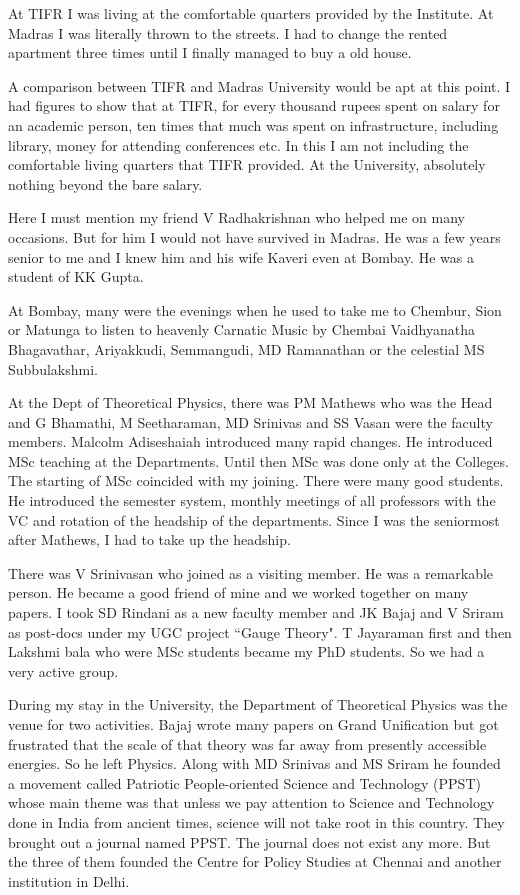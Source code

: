 At TIFR I was living at the comfortable quarters provided by the 
Institute. At Madras I was literally thrown to the streets. I had to 
change the rented apartment three times until I finally managed to buy a 
old house.

A comparison between TIFR and Madras University would be apt at this 
point. I had figures to show that at TIFR, for every thousand rupees 
spent on salary for an academic person, ten times that much was spent on 
infrastructure, including library, money for attending conferences etc. 
In this I am not including the comfortable living quarters that TIFR 
provided. At the University, absolutely nothing beyond the bare salary.

Here I must mention my friend V Radhakrishnan who helped me on many 
occasions. But for him I would not have survived in Madras. He was a few 
years senior to me and I knew him and his wife Kaveri even at Bombay. He 
was a student of KK Gupta.

At Bombay, many were the evenings when he used to take me to Chembur, 
Sion or Matunga to listen to heavenly Carnatic Music by Chembai 
Vaidhyanatha Bhagavathar, Ariyakkudi, Semmangudi, MD Ramanathan or the 
celestial MS Subbulakshmi.

At the Dept of Theoretical Physics, there was PM Mathews who was the 
Head and G Bhamathi, M Seetharaman, MD Srinivas and SS Vasan were the 
faculty members. Malcolm Adiseshaiah introduced many rapid changes. He 
introduced MSc teaching at the Departments. Until then MSc was done only 
at the Colleges. The starting of MSc coincided with my joining. There 
were many good students. He introduced the semester system, monthly 
meetings of all professors with the VC and rotation of the headship of 
the departments. Since I was the seniormost after Mathews, I had to take 
up the headship.

There was V Srinivasan who joined as a visiting member. He was a 
remarkable person. He became a good friend of mine and we worked 
together on many papers. I took SD Rindani as a new faculty member and 
JK Bajaj and V Sriram as post-docs under my UGC project ``Gauge Theory". 
T Jayaraman first and then Lakshmi bala who were MSc students became my 
PhD students. So we had a very active group.

During my stay in the University, the Department of Theoretical Physics 
was the venue for two activities. Bajaj wrote many papers on Grand 
Unification but got frustrated that the scale of that theory was far 
away from presently accessible energies. So he left Physics. Along with 
MD Srinivas and MS Sriram he founded a movement called Patriotic 
People-oriented Science and Technology (PPST) whose main theme was that 
unless we pay attention to Science and Technology done in India from 
ancient times, science will not take root in this country. They brought 
out a journal named PPST. The journal does not exist any more. But the 
three of them founded the Centre for Policy Studies at Chennai and 
another institution in Delhi.


